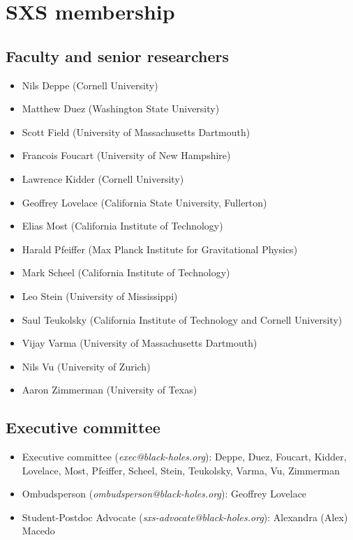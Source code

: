 \documentclass[12pt]{article}
\newcommand{\advocate}[0]{Alexandra (Alex) Macedo}
\newcommand{\ombudsperson}[0]{Geoffrey Lovelace}
\begin{document}
\section{SXS membership}
\subsection{Faculty and senior researchers}\label{sec:member_faculty}

\begin{itemize}
  \setlength\itemsep{-0.25em}
\item Nils Deppe (Cornell University)
\item Matthew Duez (Washington State University)
\item Scott Field (University of Massachusetts Dartmouth)
\item Francois Foucart (University of New Hampshire)
\item Lawrence Kidder (Cornell University)
\item Geoffrey Lovelace (California State University, Fullerton)
\item Elias Most (California Institute of Technology)
\item Harald Pfeiffer (Max Planck Institute for Gravitational Physics)
\item Mark Scheel (California Institute of Technology)
\item Leo Stein (University of Mississippi)
\item Saul Teukolsky (California Institute of Technology and Cornell University)
\item Vijay Varma (University of Massachusetts Dartmouth)
\item Nils Vu (University of Zurich)
\item Aaron Zimmerman (University of Texas)
\end{itemize}

\subsection{Executive committee}\label{sec:executive_committee_members}
\begin{itemize}
  \setlength\itemsep{-0.25em}
\item Executive committee (\emph{exec@black-holes.org}): Deppe, Duez,
  Foucart, Kidder, Lovelace, Most, Pfeiffer, Scheel, Stein, Teukolsky,
  Varma, Vu, Zimmerman
\item Ombudsperson (\emph{ombudsperson@black-holes.org}): \ombudsperson{}
\item Student-Postdoc Advocate (\emph{sxs-advocate@black-holes.org}):
  \advocate{}
\end{itemize}
\end{document}
